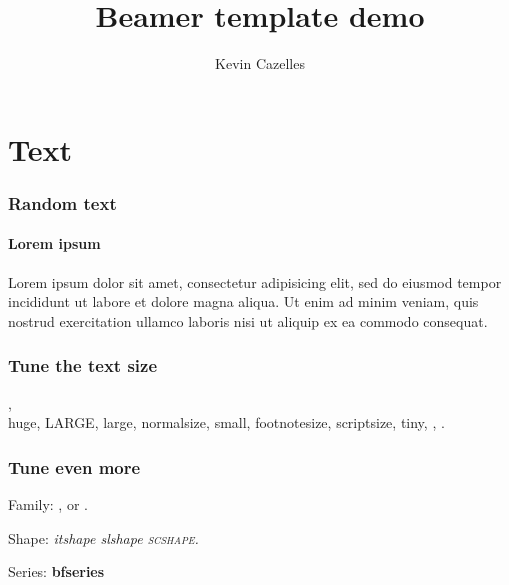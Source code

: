 \documentclass{eecslides}
\title[Beamer template]{Beamer template demo}
\date{}
\author[KevCaz]{Kevin Cazelles}
\institute{Integrative Biology, University of Guelph}
\begin{document}
{
\begin{frame}
  \titlepage
\end{frame}
}







\section{Text}


\begin{frame}
    \frametitle{Random text}
    \framesubtitle{Lorem ipsum}
        Lorem ipsum dolor sit amet, consectetur adipisicing elit, sed do eiusmod
        tempor incididunt ut labore et dolore magna aliqua. Ut enim ad minim
        veniam, quis nostrud exercitation ullamco laboris nisi ut aliquip ex
        ea commodo consequat.
\end{frame}



\begin{frame}

  \frametitle{Tune the text size}

    ,\\ \huge{huge}, \LARGE{LARGE},
    \large{large}, \normalsize{normalsize}, \small{small}, \footnotesize{footnotesize}, \scriptsize{scriptsize}, \tiny{tiny}, , .


\end{frame}



\begin{frame}

  \frametitle{Tune even more}

  Family:
  ,  or .

  Shape:
   \itshape{itshape} \slshape{slshape} \scshape{scshape}.

  Series:
  \bfseries{bfseries} 

\end{frame}


\end{document}
